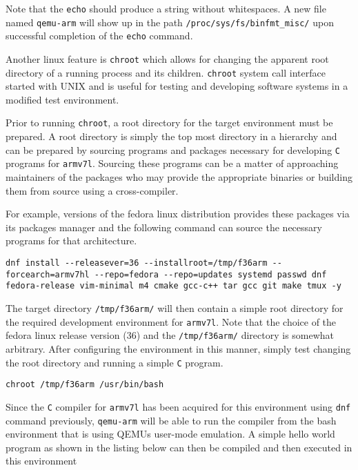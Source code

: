 Note that the \texttt{echo} should produce a string without whitespaces. A new file named \texttt{qemu-arm} will show up in the path \texttt{/proc/sys/fs/binfmt\_misc/} upon successful completion of the \texttt{echo} command.

Another linux feature is \texttt{chroot} which allows for changing the apparent root directory of a running process and its children. \texttt{chroot} system call interface started with UNIX and is useful for testing and developing software systems in a modified test environment.

Prior to running \texttt{chroot}, a root directory for the target environment must be prepared. A root directory is simply the top most directory in a hierarchy and can be prepared by sourcing programs and packages necessary for developing \texttt{C} programs for \texttt{armv7l}. Sourcing these programs can be a matter of approaching maintainers of the packages who may provide the appropriate binaries or building them from source using a cross-compiler.

For example, versions of the fedora linux distribution provides these packages via its packages manager and the following command can source the necessary programs for that architecture.

\begin{verbatim}
dnf install --releasever=36 --installroot=/tmp/f36arm --forcearch=armv7hl --repo=fedora --repo=updates systemd passwd dnf fedora-release vim-minimal m4 cmake gcc-c++ tar gcc git make tmux -y
\end{verbatim}

The target directory \texttt{/tmp/f36arm/} will then contain a simple root directory for the required development environment for \texttt{armv7l}. Note that the choice of the fedora linux release version (36) and the \texttt{/tmp/f36arm/} directory is somewhat arbitrary. After configuring the environment in this manner, simply test changing the root directory and running a simple \texttt{C} program.

\begin{verbatim}
chroot /tmp/f36arm /usr/bin/bash
\end{verbatim}

Since the \texttt{C} compiler for \texttt{armv7l} has been acquired for this environment using \texttt{dnf} command previously, \texttt{qemu-arm} will be able to run the compiler from the bash environment that is using QEMU\textquotesingle s user-mode emulation. A simple hello world program as shown in the listing below can then be compiled and then executed in this environment

